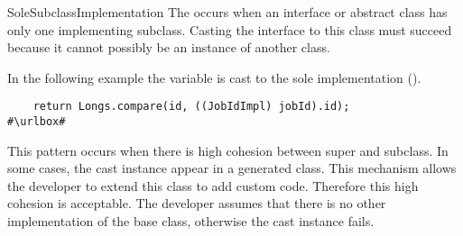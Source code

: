 \begin{pattern}{SoleSubclassImplementation}
The \thisp{} occurs when an interface or abstract class has only one implementing subclass.
Casting the interface to this class must succeed because it cannot possibly be an instance of another class.

\instances{}
In the following example%
\def\urlvar{http://bit.ly/ow2_proactive_scheduling_2Ulcjfs}
the  variable is cast to the sole implementation ().

\begin{verbatim}
    return Longs.compare(id, ((JobIdImpl) jobId).id);
#\urlbox#
\end{verbatim}



\discussion{}
This pattern occurs when there is high cohesion between super and subclass.
In some cases, the cast instance appear in a generated class.
This mechanism allows the developer to extend this class to add custom code.
Therefore this high cohesion is acceptable.
The developer assumes that there is no other implementation of the base class,
otherwise the cast instance fails.

\end{pattern}
